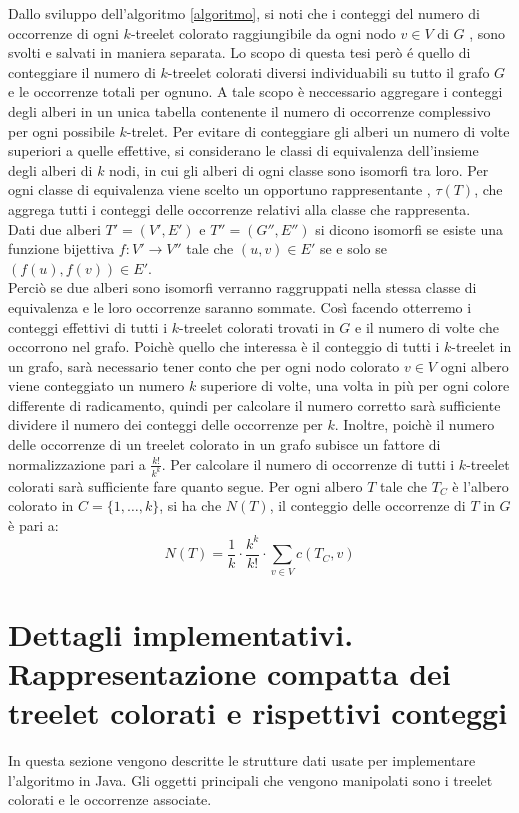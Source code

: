 Dallo sviluppo dell'algoritmo \ref{algoritmo}, si noti che i conteggi del numero di occorrenze di ogni $ k $-treelet colorato raggiungibile da ogni nodo $ v\in V $ di $ G $ , sono svolti e salvati in maniera separata.
Lo scopo di questa tesi per\`o \'e quello di conteggiare il numero di $ k $-treelet colorati diversi individuabili su tutto il grafo $ G $ e le occorrenze totali per ognuno.
A tale scopo \`e neccessario aggregare i conteggi degli alberi in un unica tabella contenente il numero di occorrenze complessivo per ogni possibile $ k $-trelet.
Per evitare di conteggiare gli alberi un numero di volte superiori a quelle effettive, si considerano le classi di equivalenza dell'insieme degli alberi di $ k $ nodi, in cui gli alberi di ogni classe sono isomorfi tra loro.
Per ogni classe di equivalenza viene scelto un opportuno rappresentante , $ \tau(T) $, che aggrega tutti i conteggi delle occorrenze relativi alla classe che rappresenta. \\
 Dati due alberi $ T' = (V',E')$ e $ T''=(G'',E'') $ si dicono isomorfi se esiste una funzione bijettiva $ f : V' \rightarrow V'' $ tale che $ (u,v)\in E' $ se e solo se $ (f(u),f(v)) \in E' $.\\
Perci\`o se due alberi sono isomorfi verranno raggruppati nella stessa classe di equivalenza e le loro occorrenze saranno sommate.
Cos\`i facendo otterremo i conteggi effettivi di tutti i $ k $-treelet colorati trovati in $ G $ e il numero di volte che occorrono nel grafo.
Poich\`e quello che interessa \`e il conteggio di tutti i $ k $-treelet in un grafo, sar\`a necessario tener conto che per ogni nodo colorato $ v\in V $ ogni albero viene conteggiato un numero $ k $ superiore di volte, una volta in pi\`u per ogni colore differente di radicamento, quindi per calcolare il numero corretto sar\`a sufficiente dividere il numero dei conteggi delle occorrenze per $ k $.
Inoltre, poich\`e il numero delle occorrenze di un treelet colorato in un grafo subisce un fattore di normalizzazione pari a $ \frac{k!}{k^k} $.
Per calcolare il numero di occorrenze di tutti i $ k $-treelet colorati sar\`a sufficiente fare quanto segue.
Per ogni albero $ T $ tale che $ T_C $ \`e l'albero colorato in $ C=\{1,\dots, k\} $, si ha che $ N(T) $, il conteggio delle occorrenze di $ T $ in $ G $ \`e pari a:
\[N(T) = \frac{1}{k} \cdot \frac{k^k}{k!} \cdot \sum_{v\in V} c(T_C,v) \]


\section{Dettagli implementativi. Rappresentazione compatta dei treelet colorati e rispettivi conteggi}
\label{section 2}
In questa sezione vengono descritte le strutture dati usate per implementare l'algoritmo in Java.
Gli oggetti principali che vengono manipolati sono i treelet colorati e le occorrenze associate.

